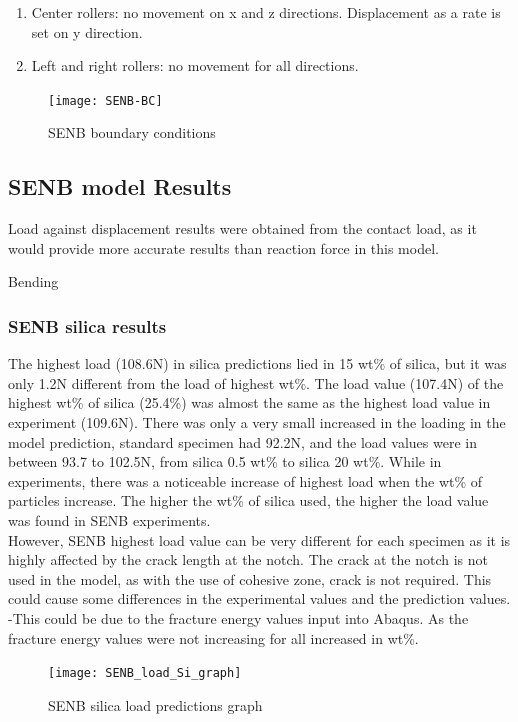 \documentclass[numbers=noendperiod,chapterprefix=on]{icldt} %
\begin{document}
\begin{enumerate}
\item Center rollers: no movement on x and z directions. Displacement as a rate is set on y direction.

\item Left and right rollers: no movement for all directions.
\end{enumerate}

\begin{figure}[!hp]
\centering
\texttt{[image: SENB-BC]}\label{SENB-BC}
\caption{SENB boundary conditions}
\end{figure}
\FloatBarrier

\subsection{SENB model Results}
Load against displacement results were obtained from the contact load, as it would provide more accurate results than reaction force in this model.

Bending


\subsubsection{SENB silica results}

The highest load (108.6N) in silica predictions lied in 15 wt\% of silica, but it was only 1.2N different from the load of highest wt\%. The load value (107.4N) of the highest wt\% of silica (25.4\%) was almost the same as the highest load value in experiment (109.6N). There was only a very small increased in the loading in the model prediction, standard specimen had 92.2N, and the load values were in between 93.7 to 102.5N, from silica 0.5 wt\% to silica 20 wt\%. While in experiments, there was a noticeable increase of highest load when the wt\% of particles increase. The higher the wt\% of silica used, the higher the load value was found in SENB experiments.
\\
However, SENB highest load value can be very different for each specimen as it is highly affected by the crack length at the notch. The crack at the notch is not used in the model, as with the use of cohesive zone, crack is not required. This could cause some differences in the experimental values and the prediction values.
-This could be due to the fracture energy values input into Abaqus. As the fracture energy values were not increasing for all increased in wt\%.

\begin{figure}[!hp]
\centering
\texttt{[image: SENB\_load\_Si\_graph]}\label{SENB_load_Si_graph}
\caption{SENB silica load predictions graph}
\end{figure}
\FloatBarrier
\end{document}
